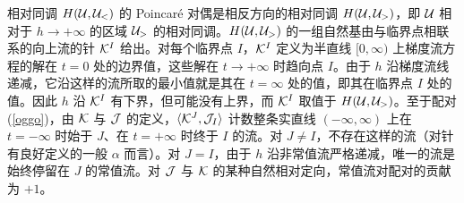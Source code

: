 相对同调 $H({\mathcal U},{\mathcal U}_<)$ 的 Poincar\'e 对偶是相反方向的相对同调 $H({\mathcal U},{\mathcal U}_>)$，即 ${\mathcal U}$ 相对于 $h\to+\infty$ 的区域 ${\mathcal U}_>$ 的相对同调。$H({\mathcal U},{\mathcal U}_>)$ 的一组自然基由与临界点相联系的向上流的针 ${\mathcal K}^I$ 给出。对每个临界点 $I$，${\mathcal K}^I$ 定义为半直线 $[0,\infty)$ 上梯度流方程的解在 $t=0$ 处的边界值，这些解在 $t\to+\infty$ 时趋向点 $I$。由于 $h$ 沿梯度流线递减，它沿这样的流所取的最小值就是其在 $t=\infty$ 处的值，即其在临界点 $I$ 处的值。因此 $h$ 沿 ${\mathcal K}^I$ 有下界，但可能没有上界，而 ${\mathcal K}^I$ 取值于 $H({\mathcal U},{\mathcal U}_>)$。至于配对 (\ref{oggo})，由 ${\mathcal K}$ 与 ${\mathcal J}$ 的定义，$\langle{\mathcal K}^J,{\mathcal J}_I\rangle$ 计数整条实直线 $(-\infty,\infty)$ 上在 $t=-\infty$ 时始于 $J$、在 $t=+\infty$ 时终于 $I$ 的流。对 $J\not=I$，不存在这样的流（对针有良好定义的一般 $\alpha$ 而言）。对 $J=I$，由于 $h$ 沿非常值流严格递减，唯一的流是始终停留在 $J$ 的常值流。对 ${\mathcal J}$ 与 ${\mathcal K}$ 的某种自然相对定向，常值流对配对的贡献为 $+1$。
